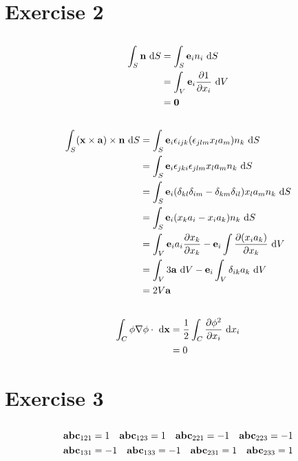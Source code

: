 \documentclass[12pt]{article}
\newcommand{\xx}{{\bf x}}
\newcommand{\bb}{{\bf b}}
\newcommand{\ba}{{\bf a}}
\newcommand{\bc}{{\bf c}}
\newcommand{\ee}{{\bf e}}
\newcommand{\nn}{{\bf n}}
\newcommand{\bnabla}{{\bf \nabla}}
\newcommand{\pr}{{\partial}}
\newcommand{\dx}[1]{\text{ d}#1}
\begin{document}
\section{Exercise 2}
\subsection{}
\begin{align*}
\int_S\nn\dx{S} &= \int_S\ee_i n_i\dx{S} \\
&=\int_V \ee_i\frac{\pr 1}{\pr x_i}\dx{V}\\
&= {\bf 0}
\end{align*}


\subsection{}
\begin{align*}
\int_S (\xx\times\ba)\times\nn\dx{S} &= \int_S\ee_i \epsilon_{ijk} (\epsilon_{jlm} x_la_m) n_k\dx{S}\\
	&=\int_S\ee_i \epsilon_{jki} \epsilon_{jlm} x_la_m n_k\dx{S}\\
	&=\int_S\ee_i (\delta_{kl}\delta_{im} - \delta_{km}\delta_{il}) x_la_mn_k\dx{S}\\
	&= \int_S\ee_i (x_ka_i - x_ia_k)n_k\dx{S}\\
	&= \int_V \ee_ia_i\frac{\pr x_k}{\pr x_k} - \ee_i\int \frac{\pr (x_ia_k)}{\partial x_k} \dx{V} \\
	&= \int_V 3\ba\dx{V} - \ee_i\int_V \delta_{ik}a_k \dx{V}\\
	& = 2V\ba
\end{align*}

\subsection{}
\begin{align*}
\int_C\phi\bnabla\phi\cdot\dx{\xx} &= \frac 1 2 \int_C\frac{\pr \phi^2}{\pr x_i}\dx{x_i}\\	
	&=0
\end{align*}

\section{Exercise 3}
\subsection{}
\[
\ba\bb\bc_{121} = 1 \quad \ba\bb\bc_{123} = 1 \quad  \ba\bb\bc_{221} = -1  \quad  \ba\bb\bc_{223} = -1
\]
\[
\ba\bb\bc_{131} = -1 \quad \ba\bb\bc_{133} = -1 \quad  \ba\bb\bc_{231} = 1  \quad  \ba\bb\bc_{233} = 1
\]
\end{document}
